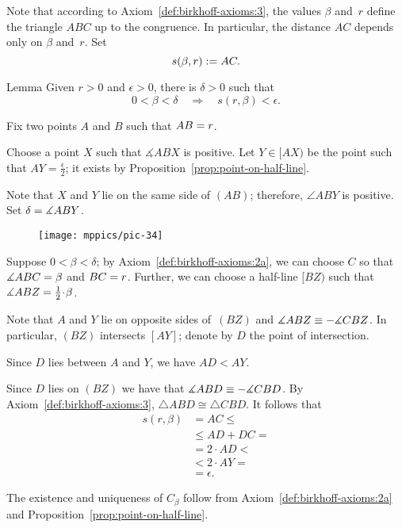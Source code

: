 Note that according to Axiom~\ref{def:birkhoff-axioms:3}, 
the values
$\beta$ and~$r$ define the triangle $ABC$ up to the congruence.
In particular, the distance $AC$ depends only on $\beta$ and~$r$.
Set 
$$s(\beta,r):= AC.$$

\begin{thm}[\abs]{Lemma}\label{lem:f(r,a)}
Given $r>0$ and $\epsilon>0$, there is $\delta>0$ such that
\[0<\beta<\delta\quad\Longrightarrow\quad s(r,\beta)<\epsilon.\]

\end{thm}

Fix two points $A$ and $B$ such that $AB\z=r$.

Choose a point $X$ such that $\measuredangle ABX$ is positive.
Let $Y\in [AX)$ be the point such that $AY=\tfrac\epsilon2$;
it exists by Proposition~\ref{prop:point-on-half-line}.

Note that $X$ and $Y$ lie on the same side of $(AB)$;
therefore, $\angle ABY$ is positive. 
Set $\delta\z=\measuredangle ABY$.

{

\begin{wrapfigure}{o}{36mm}
\centering
\texttt{[image: mppics/pic-34]}
\end{wrapfigure}

Suppose $0<\beta<\delta$;
by Axiom~\ref{def:birkhoff-axioms:2a}, we can choose $C$ so that $\measuredangle ABC\z=\beta$ and $BC\z=r$.
Further, we can choose a half-line $[BZ)$ such that $\measuredangle ABZ\z=\tfrac12\cdot \beta$.

Note that $A$ and $Y$ lie on opposite sides of~$(BZ)$ and  $\measuredangle ABZ\z\equiv -\measuredangle CBZ$.
In particular, $(BZ)$ intersects $[AY]$;
denote by $D$ the point of intersection.

Since $D$ lies between $A$ and $Y$, we have $AD<AY$.

Since $D$ lies on $(BZ)$ we have that $\measuredangle ABD\z\equiv -\measuredangle CBD$.
By Axiom~\ref{def:birkhoff-axioms:3},
$\triangle ABD\cong \triangle CBD$.
It follows that
\begin{align*}
s(r,\beta)&=AC\le
\\
&\le AD+DC=
\\
&=2\cdot AD< 
\\
&< 2\cdot AY=
\\
&=\epsilon.
\end{align*}
\qedsf

}

The existence and uniqueness of $C_\beta$ follow from Axiom~\ref{def:birkhoff-axioms:2a} and Proposition~\ref{prop:point-on-half-line}.

